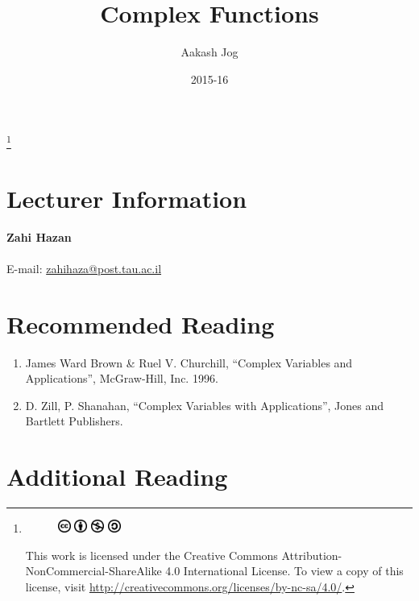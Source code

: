 \documentclass[titlepage, fleqn, a4paper, 12pt, twoside]{article}
\title{Complex Functions}
\author{Aakash Jog}
\date{2015-16}
\theoremstyle{definition}
\theoremstyle{theorem}
\newcommand\blfootnote[1]{%
	\begingroup
	\renewcommand\thefootnote{}\footnote{#1}%
	\addtocounter{footnote}{-1}%
	\endgroup
}
\begin{document}
\maketitle

\blfootnote
{	
	\begin{figure}[H]
		\includegraphics[height = 12pt]{cc.eps}
		\includegraphics[height = 12pt]{by.eps}
		\includegraphics[height = 12pt]{nc.eps}
		\includegraphics[height = 12pt]{sa.eps}
	\end{figure}
	This work is licensed under the Creative Commons Attribution-NonCommercial-ShareAlike 4.0 International License. To view a copy of this license, visit \url{http://creativecommons.org/licenses/by-nc-sa/4.0/}.
} %

\tableofcontents

\newpage
\section{Lecturer Information}

\textbf{Zahi Hazan}\\
~\\
E-mail: \href{mailto:zahihaza@post.tau.ac.il}{zahihaza@post.tau.ac.il}\\

\section{Recommended Reading}

\begin{enumerate}
	\item James Ward Brown \& Ruel V. Churchill, ``Complex Variables and Applications'', McGraw-Hill, Inc. 1996.
	\item D. Zill, P. Shanahan, ``Complex Variables with Applications'', Jones and Bartlett Publishers.
\end{enumerate}

\section{Additional Reading}
\end{document}
